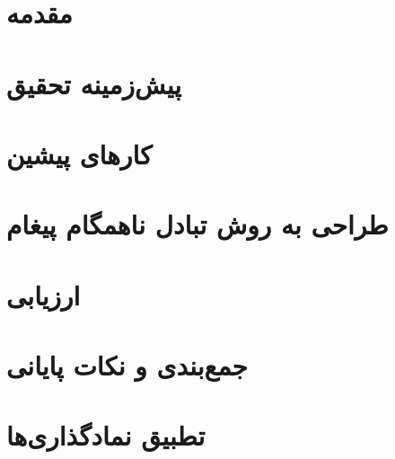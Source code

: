 \documentclass[twoside, a4paper,11pt]{book}
\numberwithin{equation}{chapter}
\numberwithin{table}{chapter}
\numberwithin{figure}{chapter}
\numberwithin{equation}{chapter}
\begin{document}


\newpage
\thispagestyle{empty}
\mbox{}

\small{
\tableofcontents
\listoffigures
}


\newpage


\pagestyle{fancy}
\fancyhead{} 
\fancyhead[RO]{\leftmark}
\fancyhead[LO]{\thepage}
\fancyhead[LE]{\rightmark}
\fancyhead[RE]{\thepage}
\fancyfoot{} 
\renewcommand{\headrulewidth}{0.6pt} 
\renewcommand{\footrulewidth}{0pt}

\setcounter{page}{1}

\chapter{مقدمه}
\label{chapter:Introduction}
\thispagestyle{plain}

\chapter{پیش‌زمینه تحقیق}
\label{chapter:Preliminaries}
\thispagestyle{plain}

\chapter{کارهای پیشین}
\label{chapter:RelatedWork}
\thispagestyle{plain}

\chapter{طراحی به روش تبادل ناهمگام پیغام}
\label{chapter:proposedFramework}
\thispagestyle{plain}

\chapter{ارزیابی}
\label{chapter:evaluation}
\thispagestyle{plain}

\chapter{جمع‌بندی و نکات پایانی}
\label{chapter:Conclusion}
\thispagestyle{plain}


\appendix
\chapter{تطبیق نمادگذاری‌ها}
\label{appendix}
\thispagestyle{plain}

\newpage
\end{document}
